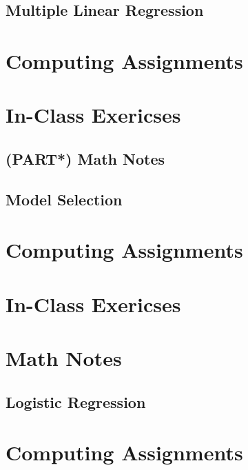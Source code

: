 \documentclass[]{book}
\begin{document}
\chapter{Multiple Linear Regression}\label{mlr}

\part*{Computing
Assignments}\label{part-computing-assignments-1}

\part*{In-Class Exericses}\label{part-in-class-exericses}

\chapter{(PART*) Math Notes}\label{part-math-notes}

\chapter{Model Selection}\label{select}

\part*{Computing
Assignments}\label{part-computing-assignments-2}

\part*{In-Class Exericses}\label{part-in-class-exericses-1}

\part*{Math Notes}\label{part-math-notes-1}

\chapter{Logistic Regression}\label{logistic}

\part*{Computing
Assignments}\label{part-computing-assignments-3}
\end{document}
